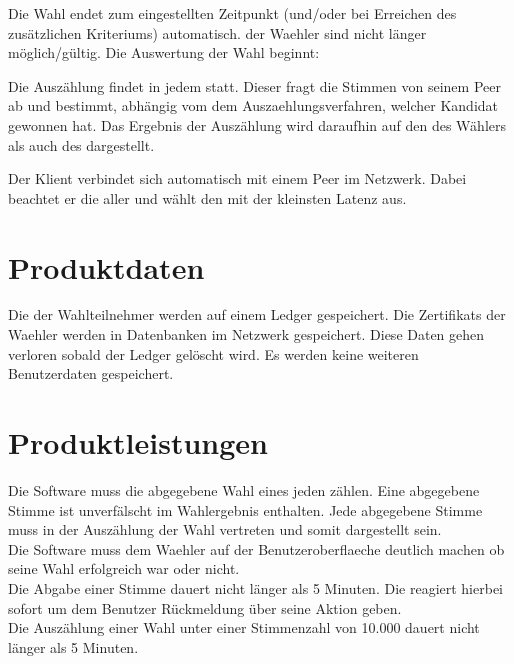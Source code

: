 \documentclass[parskip=full,11pt,twoside]{scrartcl}
\begin{document}
Die \gls{Wahl} endet zum eingestellten Zeitpunkt (und/oder bei Erreichen des zusätzlichen Kriteriums) automatisch.  der \gls{Waehler} sind nicht länger möglich/gültig. Die Auswertung der \gls{Wahl} beginnt:

Die Auszählung findet in jedem  statt. Dieser fragt die Stimmen von seinem \gls{Peer} ab und bestimmt, abhängig vom dem \gls{Auszaehlungsverfahren}, welcher \gls{Kandidat} gewonnen hat. Das Ergebnis der Auszählung wird daraufhin auf den  des Wählers als auch des  dargestellt.

Der \gls{Klient} verbindet sich automatisch mit einem \gls{Peer} im \gls{Netzwerk}. Dabei beachtet er die  aller  und wählt den mit der kleinsten \gls{Latenz} aus.

\section{Produktdaten}

Die  der Wahlteilnehmer werden auf einem \gls{Ledger} gespeichert.
Die \glspl{Zertifikat} der \gls{Waehler} werden in Datenbanken im Netzwerk gespeichert.
Diese Daten gehen verloren sobald der \gls{Ledger} gelöscht wird. Es werden keine weiteren \gls{Benutzerdaten} gespeichert.

\section{Produktleistungen}
Die Software muss die abgegebene \gls{Wahl} eines jeden  zählen. Eine abgegebene Stimme ist unverfälscht im Wahlergebnis enthalten.
Jede abgegebene \gls{Stimme} muss in der Auszählung der \gls{Wahl} vertreten und somit dargestellt sein. \\
Die Software muss dem \gls{Waehler} auf der \gls{Benutzeroberflaeche} deutlich machen ob seine \gls{Wahl} erfolgreich war oder nicht. \\
Die Abgabe einer \gls{Stimme} dauert nicht länger als 5 Minuten.
Die  reagiert hierbei sofort um dem \gls{Benutzer} Rückmeldung über seine Aktion geben. \\
Die Auszählung einer \gls{Wahl} unter einer Stimmenzahl von 10.000  dauert nicht länger als 5 Minuten.
\end{document}
